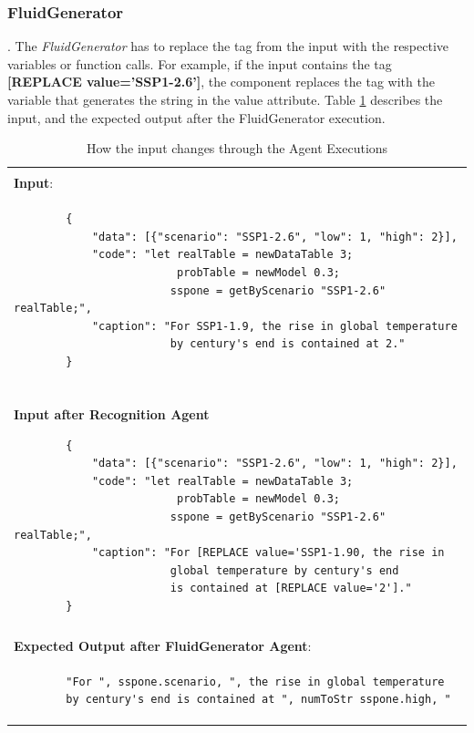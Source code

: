 \subsubsection{FluidGenerator}.
The \textit{FluidGenerator} has to replace the tag from the input with the respective variables or function calls. For example, if the input contains the tag \textbf{[REPLACE value='SSP1-2.6']}, the component replaces the tag with the variable that generates the string in the value attribute. Table \ref{tab:agent_execution_sample} describes the input, and the expected output after the FluidGenerator execution.

\begin{table}[!ht]
    \centering
    \caption{How the input changes through the Agent Executions \label{tab:agent_execution_sample}}
    \begin{tabular}{p{13cm}}
    \hline
    \hline
    \\\textbf{Input}:\\
    \begin{verbatim}
        {
            "data": [{"scenario": "SSP1-2.6", "low": 1, "high": 2}],
            "code": "let realTable = newDataTable 3;
                         probTable = newModel 0.3;
                        sspone = getByScenario "SSP1-2.6" realTable;",
            "caption": "For SSP1-1.9, the rise in global temperature
                        by century's end is contained at 2."
        }
    \end{verbatim}
    \\
    \hline
    \\
    \textbf{Input after Recognition Agent}
    \begin{verbatim}
        {
            "data": [{"scenario": "SSP1-2.6", "low": 1, "high": 2}],
            "code": "let realTable = newDataTable 3;
                         probTable = newModel 0.3;
                        sspone = getByScenario "SSP1-2.6" realTable;",
            "caption": "For [REPLACE value='SSP1-1.90, the rise in
                        global temperature by century's end
                        is contained at [REPLACE value='2']."
        }
    \end{verbatim}\\
    \hline
    \\\textbf{Expected Output after FluidGenerator Agent}:\\
    \begin{verbatim}
        "For ", sspone.scenario, ", the rise in global temperature
        by century's end is contained at ", numToStr sspone.high, "
    \end{verbatim}

    \\
    \hline
    \hline
    \end{tabular}
\end{table}


